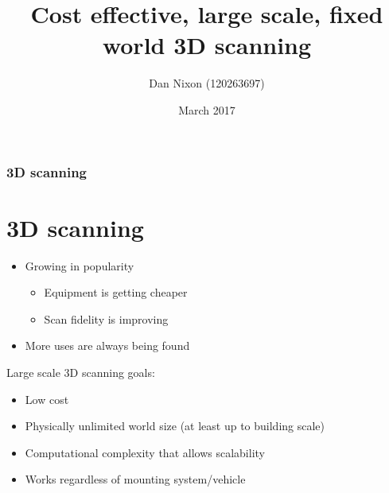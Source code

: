 \documentclass[10pt,serif,t]{beamer}
\title{Cost effective, large scale, fixed world 3D scanning}
\author{Dan Nixon (120263697)}
\date{March 2017}
\newenvironment{Slide}[1]
{
  \begin{frame}[fragile,environment=Slide]
    \frametitle{#1}
    \section{#1}
  }
  {
  \end{frame}
}
\begin{document}
\frame{\titlepage}

\begin{Slide}{3D scanning}
  \begin{itemize}
    \item
      Growing in popularity

      \begin{itemize}
        \item
          Equipment is getting cheaper

        \item
          Scan fidelity is improving

      \end{itemize}

    \pause

    \item
      More uses are always being found

  \end{itemize}

  \vspace{1em}

  \pause

  Large scale 3D scanning goals:

  \begin{itemize}
    \item
      Low cost

    \item
      Physically unlimited world size (at least up to building scale)

    \item
      Computational complexity that allows scalability

    \item
      Works regardless of mounting system/vehicle

  \end{itemize}
\end{Slide}
\end{document}
